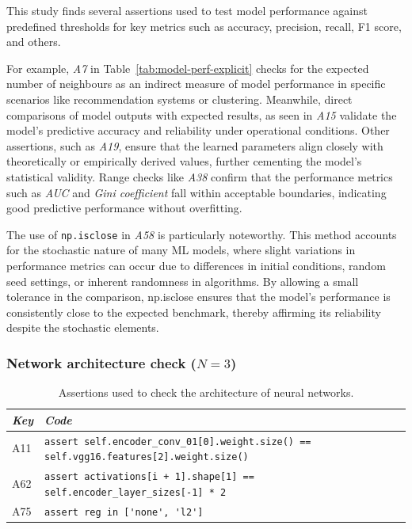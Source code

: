 This study finds several assertions used to test model performance against predefined thresholds for key metrics such as accuracy, precision, recall, F1 score, and others.

For example, \emph{A7} in Table~\ref{tab:model-perf-explicit} checks for the expected number of neighbours as an indirect measure of model performance in specific scenarios like recommendation systems or clustering. Meanwhile, direct comparisons of model outputs with expected results, as seen in \emph{A15} validate the model's predictive accuracy and reliability under operational conditions. Other assertions, such as \emph{A19}, ensure that the learned parameters align closely with theoretically or empirically derived values, further cementing the model’s statistical validity. Range checks like \emph{A38} confirm that the performance metrics such as \emph{AUC} and \emph{Gini coefficient} fall within acceptable boundaries, indicating good predictive performance without overfitting.

The use of \texttt{np.isclose} in \emph{A58} is particularly noteworthy. This method accounts for the stochastic nature of many ML models, where slight variations in performance metrics can occur due to differences in initial conditions, random seed settings, or inherent randomness in algorithms. By allowing a small tolerance in the comparison, np.isclose ensures that the model's performance is consistently close to the expected benchmark, thereby affirming its reliability despite the stochastic elements.


\subsubsection{Network architecture check ($N = 3$)}

\begin{table}
  \centering
  \caption{Assertions used to check the architecture of neural networks.}
  \begin{tabular}{@{}m{} m{}@{}}
    \toprule
    \emph{\textbf{Key}}&
    \emph{\textbf{Code}}\\
    \midrule

    A11 &
    \lstinline[]$assert self.encoder_conv_01[0].weight.size() == self.vgg16.features[2].weight.size()$\\

    A62 &
    \lstinline[]$assert activations[i + 1].shape[1] == self.encoder_layer_sizes[-1] * 2$\\
    
    A75 &
    \lstinline[]$assert reg in ['none', 'l2']$\\
    \bottomrule
  \end{tabular}
  \label{tab:assert-network-architecture}
\end{table}

